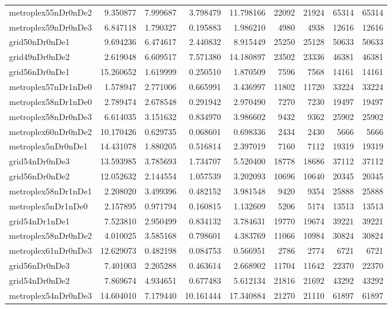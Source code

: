 \begin{longtable}{|l|r|r|r|r|r|r|r|r|}
metroplex55nDr0nDe2 & 9.350877 & 7.999687 & 3.798479 & 11.798166 & 22092 & 21924 & 65314 & 65314 \\
metroplex59nDr0nDe3 & 6.847118 & 1.790327 & 0.195883 & 1.986210 & 4980 & 4938 & 12616 & 12616 \\
grid50nDr0nDe1 & 9.694236 & 6.474617 & 2.440832 & 8.915449 & 25250 & 25128 & 50633 & 50633 \\
grid49nDr0nDe2 & 2.619048 & 6.609517 & 7.571380 & 14.180897 & 23502 & 23336 & 46381 & 46381 \\
grid56nDr0nDe1 & 15.260652 & 1.619999 & 0.250510 & 1.870509 & 7596 & 7568 & 14161 & 14161 \\
metroplex57nDr1nDe0 & 1.578947 & 2.771006 & 0.665991 & 3.436997 & 11802 & 11720 & 33224 & 33224 \\
metroplex58nDr1nDe0 & 2.789474 & 2.678548 & 0.291942 & 2.970490 & 7270 & 7230 & 19497 & 19497 \\
metroplex58nDr0nDe3 & 6.614035 & 3.151632 & 0.834970 & 3.986602 & 9432 & 9362 & 25902 & 25902 \\
metroplex60nDr0nDe2 & 10.170426 & 0.629735 & 0.068601 & 0.698336 & 2434 & 2430 & 5666 & 5666 \\
metroplex5nDr0nDe1 & 14.431078 & 1.880205 & 0.516814 & 2.397019 & 7160 & 7112 & 19319 & 19319 \\
grid54nDr0nDe3 & 13.593985 & 3.785693 & 1.734707 & 5.520400 & 18778 & 18686 & 37112 & 37112 \\
grid56nDr0nDe2 & 12.052632 & 2.144554 & 1.057539 & 3.202093 & 10696 & 10640 & 20345 & 20345 \\
metroplex58nDr1nDe1 & 2.208020 & 3.499396 & 0.482152 & 3.981548 & 9420 & 9354 & 25888 & 25888 \\
metroplex5nDr1nDe0 & 2.157895 & 0.971794 & 0.160815 & 1.132609 & 5206 & 5174 & 13513 & 13513 \\
grid54nDr1nDe1 & 7.523810 & 2.950499 & 0.834132 & 3.784631 & 19770 & 19674 & 39221 & 39221 \\
metroplex58nDr0nDe2 & 4.010025 & 3.585168 & 0.798601 & 4.383769 & 11066 & 10984 & 30824 & 30824 \\
metroplex61nDr0nDe3 & 12.629073 & 0.482198 & 0.084753 & 0.566951 & 2786 & 2774 & 6721 & 6721 \\
grid56nDr0nDe3 & 7.401003 & 2.205288 & 0.463614 & 2.668902 & 11704 & 11642 & 22370 & 22370 \\
grid54nDr0nDe2 & 7.869674 & 4.934651 & 0.677483 & 5.612134 & 21816 & 21692 & 43292 & 43292 \\
metroplex54nDr0nDe3 & 14.604010 & 7.179440 & 10.161444 & 17.340884 & 21270 & 21110 & 61897 & 61897 \\

\end{longtable}
